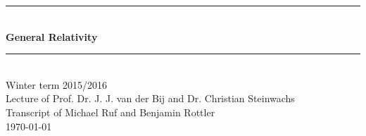 \newcommand{\HRule}{\rule{\linewidth}{0.5mm}}
\begin{titlepage}
\begin{center}
  \HRule \\[0.4cm]
  { \huge \bfseries General Relativity}\\
  \HRule \\[0.5cm]
  \large Winter term 2015/2016 \\[0.5cm]  
  Lecture of Prof. Dr. J. J. van der Bij and Dr. Christian Steinwachs\\
  Transcript of Michael Ruf and Benjamin Rottler \\[1.5cm]
  \today
  \vfill
  \normalsize
   \\
   \\
\end{center}
\end{titlepage}
